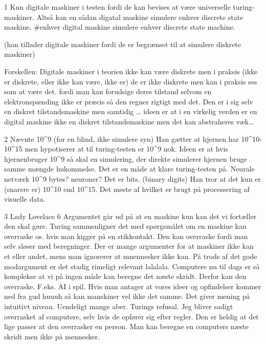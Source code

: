 \documentclass{article}
\author{Mikkel Kragh Mathiesen, Jannik Gram, Rune \& Rasmus Abrahams{\tt (son|en)}}
\title{}
\date{\today}
\begin{document}
\maketitle


1
Kun digitale maskiner i testen fordi de kan bevises at være universelle turing-maskiner.
Altså kan en sådan digatal maskine simulere enhver discrete state maskine.
#enhver digital maskine simulere enhver discrete state machine.

(han tillader digitale maskiner fordi de er begrænset til at simulere diskrete maskiner)

Forskellen: Digitale maskiner i teorien ikke kan være diskrete men i praksis (ikke er diskrete, eller ikke kan være, ikke er) de er ikke diskrete men kan i praksis ses som at være det. fordi man kan forudsige deres tilstand selvom en elektronspænding ikke er præcis så den regner rigtigt med det.
Den er i sig selv en diskret tilstandsmaskine men samtidig … ideen er at i en virkelig verden er en digital maskine ikke en  diskret tilstandsmaskine men det kan abstraheres væk…

2
Nævnte 10^9 (for en blind, ikke simulere syn)
Han gætter at hjernen har 10^10-10^15 men hypotiserer at til turing-testen er 10^9 nok.
Ideen er at hvis hjernenbruger 10^9 så skal en simulering, der direkte simulerer hjernen bruge samme mængde hukommelse. Det er en måde at klare turing-testen på.
Neurale netværk
10^9 bytes? neuroner? Det er bits. (binary digits)
Han tror at det kun er (snarere er) 10^10 end 10^15.
Det meste af hvilket er brugt på processering af visuelle data.

3
Lady Lovelace 6
Argumentet går ud på at en maskine kun kan det vi fortæller den skal gøre. Turing sammenligner det med spørgsmålet om en maskine kan overraske os. hvis man kigger på en stikkontakt. Den kan overraske fordi man selv sløser med beregninger.
Der er mange argumenter for at maskiner ikke kan et eller andet, mens man ignorerer at mnennesker ikke kan.
På trods af det gode modargument er det stadig rimeligt relevant lalalala.
Computere nu til dags er så komplekse at vi på ingen måde kan beregne det næste skridt. Derfor kan den overraske. F.eks. AI i spil.
Hvis man antager at vores ideer og opfindelser kommer ned fra gud huuuh så kan manskiner vel ikke det samme.
Det giver mening på intuitivt niveau.
Uendeligt mange aber.
Turings refusal. Jeg bliver sadigt overrasket af computere, selv hvis de opfører sig efter regler. Den er heldig at det lige passer at den overrasker en person.
Man kan beregne en computers næste skridt men ikke på mennesker.
\end{document}
